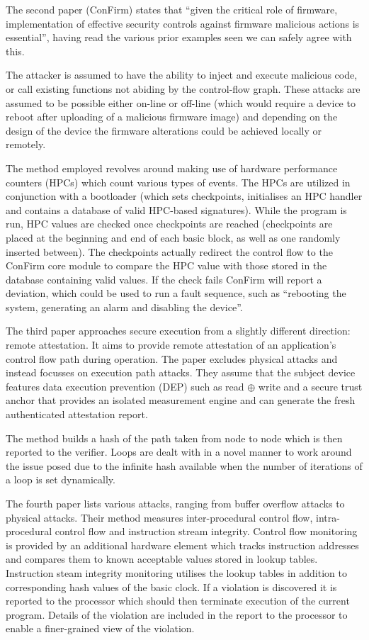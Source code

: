 The second paper \cite{Wang2016} (ConFirm) states that ``given the critical role of firmware, implementation of effective security controls against firmware malicious actions is essential'', having read the various prior examples seen we can safely agree with this. 

The attacker is assumed to have the ability to inject and execute malicious code, or call existing functions not abiding by the control-flow graph. These attacks are assumed to be possible either on-line or off-line (which would require a device to reboot after uploading of a malicious firmware image) and depending on the design of the device the firmware alterations could be achieved locally or remotely.

The method employed revolves around making use of hardware performance counters (HPCs) which count various types of events. The HPCs are utilized in conjunction with a bootloader (which sets checkpoints, initialises an HPC handler and contains a database of valid HPC-based signatures). While the program is run, HPC values are checked once checkpoints are reached (checkpoints are placed at the beginning and end of each basic block, as well as one randomly inserted between). The checkpoints actually redirect the control flow to the ConFirm core module to compare the HPC value with those stored in the database containing valid values. If the check fails ConFirm will report a deviation, which could be used to run a fault sequence, such as ``rebooting the system, generating an alarm and disabling the device''.

The third paper \cite{Abera2016} approaches secure execution from a slightly different direction: remote attestation. It aims to provide remote attestation of an application's control flow path during operation. The paper excludes physical attacks and instead focusses on execution path attacks. They assume that the subject device features data execution prevention (DEP) such as read $\oplus$ write and a secure trust anchor that provides an isolated measurement engine and can generate the fresh authenticated attestation report.

The method builds a hash of the path taken from node to node which is then reported to the verifier. Loops are dealt with in a novel manner to work around the issue posed due to the infinite hash available when the number of iterations of a loop is set dynamically.

The fourth paper \cite{Arora2006} lists various attacks, ranging from buffer overflow attacks to physical attacks. Their method measures inter-procedural control flow, intra-procedural control flow and instruction stream integrity. Control flow monitoring is provided by an additional hardware element which tracks instruction addresses and compares them to known acceptable values stored in lookup tables. Instruction steam integrity monitoring utilises the lookup tables in addition to corresponding hash values of the basic clock. If a violation is discovered it is reported to the processor which should then terminate execution of the current program. Details of the violation are included in the report to the processor to enable a finer-grained view of the violation.


